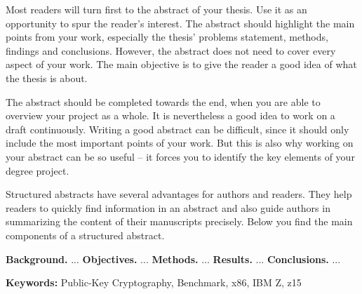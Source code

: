 \abstract
Most readers will turn first to the abstract of your thesis. Use it as an opportunity to spur the reader's interest. The abstract should highlight the main points from your work, especially the thesis' problems statement, methods, findings and conclusions. However, the abstract does not need to cover every aspect of your work. The main objective is to give the reader a good idea of what the thesis is about.

The abstract should be completed towards the end, when you are able to overview your project as a whole. It is nevertheless a good idea to work on a draft continuously. Writing a good abstract can be difficult, since it should only include the most important points of your work. But this is also why working on your abstract can be so useful -- it forces you to identify the key elements of your degree project.

Structured abstracts have several advantages for authors and readers. They help readers to quickly find information in an abstract and also guide authors in summarizing the content of their manuscripts precisely. Below you find the main components of a structured abstract.

\noindent
\textbf{Background.} ... \newline
\textbf{Objectives.} ... \newline
\textbf{Methods.} ... \newline
\textbf{Results.} ... \newline
\textbf{Conclusions.} ...

\vspace{1cm}
\noindent
\textbf{Keywords:} Public-Key Cryptography, Benchmark, x86, IBM Z, z15











\cleardoublepage